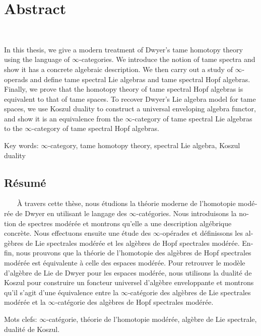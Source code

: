 

\cleardoublepage
\chapter*{Abstract}
~\newline~\newline~
In this thesis, we give a modern treatment of Dwyer's tame homotopy theory using the language of $\infty$-categories.
We introduce the notion of tame spectra and show it has a concrete algebraic description.
We then carry out a study of $\infty$-operads and define tame spectral Lie algebras and tame spectral Hopf algebras. 
Finally, we prove that the homotopy theory of tame spectral Hopf algebras is equivalent to that of tame spaces. To recover Dwyer's Lie algebra model for tame spaces, we use Koszul duality to construct a universal enveloping algebra functor, and show it is an equivalence from the $\infty$-category of tame spectral Lie algebras to the $\infty$-category of tame spectral Hopf algebras.



\vskip0.5cm
Key words: $\infty$-category, tame homotopy theory, spectral Lie algebra, Koszul duality





\begin{otherlanguage}{french}
\cleardoublepage
\chapter*{Résumé}
~\newline~\newline~
À travers cette thèse, nous étudions la théorie moderne de l’homotopie modérée de Dwyer en utilisant le langage des $\infty$-catégories.
Nous introduisons la notion de spectres modérée et montrons qu'elle a une description algébrique concrète.
Nous effectuons ensuite une étude des $\infty$-opérades et définissons les algèbres de Lie spectrales modérée et les algèbres de Hopf spectrales modérée. 
Enfin, nous prouvons que la théorie de l'homotopie des algèbres de Hopf spectrales modérée est équivalente à celle des espaces modérée. Pour retrouver le modèle d'algèbre de Lie de Dwyer pour les espaces modérée, nous utilisons la dualité de Koszul pour construire un foncteur universel d'algèbre enveloppante et montrons qu'il s'agit d'une équivalence entre la $\infty$-catégorie des algèbres de Lie spectrales modérée et la $\infty$-catégorie des algèbres de Hopf spectrales modérée.


\vskip0.5cm
Mots clefs: $\infty$-catégorie, théorie de l'homotopie modérée, algèbre de Lie spectrale, dualité de Koszul.
\end{otherlanguage}



